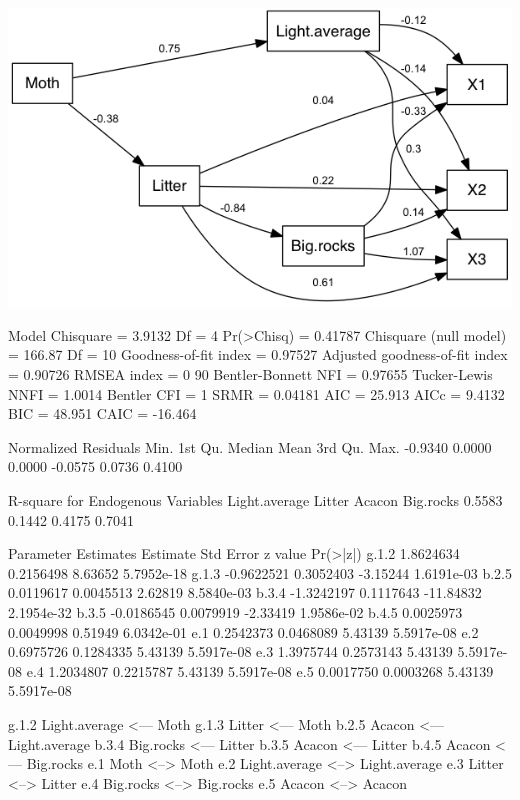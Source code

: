 \documentclass[12pt]{article}
\begin{document}
\includegraphics{semPath1.png}

\begin{Schunk}
\begin{Soutput}
 Model Chisquare =  3.9132   Df =  4 Pr(>Chisq) = 0.41787
 Chisquare (null model) =  166.87   Df =  10
 Goodness-of-fit index =  0.97527
 Adjusted goodness-of-fit index =  0.90726
 RMSEA index =  0   90%
 Bentler-Bonnett NFI =  0.97655
 Tucker-Lewis NNFI =  1.0014
 Bentler CFI =  1
 SRMR =  0.04181
 AIC =  25.913
 AICc =  9.4132
 BIC =  48.951
 CAIC =  -16.464

 Normalized Residuals
   Min. 1st Qu.  Median    Mean 3rd Qu.    Max. 
-0.9340  0.0000  0.0000 -0.0575  0.0736  0.4100 

 R-square for Endogenous Variables
Light.average        Litter        Acacon     Big.rocks 
       0.5583        0.1442        0.4175        0.7041 

 Parameter Estimates
      Estimate   Std Error z value   Pr(>|z|)  
g.1.2  1.8624634 0.2156498   8.63652 5.7952e-18
g.1.3 -0.9622521 0.3052403  -3.15244 1.6191e-03
b.2.5  0.0119617 0.0045513   2.62819 8.5840e-03
b.3.4 -1.3242197 0.1117643 -11.84832 2.1954e-32
b.3.5 -0.0186545 0.0079919  -2.33419 1.9586e-02
b.4.5  0.0025973 0.0049998   0.51949 6.0342e-01
e.1    0.2542373 0.0468089   5.43139 5.5917e-08
e.2    0.6975726 0.1284335   5.43139 5.5917e-08
e.3    1.3975744 0.2573143   5.43139 5.5917e-08
e.4    1.2034807 0.2215787   5.43139 5.5917e-08
e.5    0.0017750 0.0003268   5.43139 5.5917e-08
                                      
g.1.2 Light.average <--- Moth         
g.1.3 Litter <--- Moth                
b.2.5 Acacon <--- Light.average       
b.3.4 Big.rocks <--- Litter           
b.3.5 Acacon <--- Litter              
b.4.5 Acacon <--- Big.rocks           
e.1   Moth <--> Moth                  
e.2   Light.average <--> Light.average
e.3   Litter <--> Litter              
e.4   Big.rocks <--> Big.rocks        
e.5   Acacon <--> Acacon              


\end{Soutput}
\end{Schunk}
\end{document}
